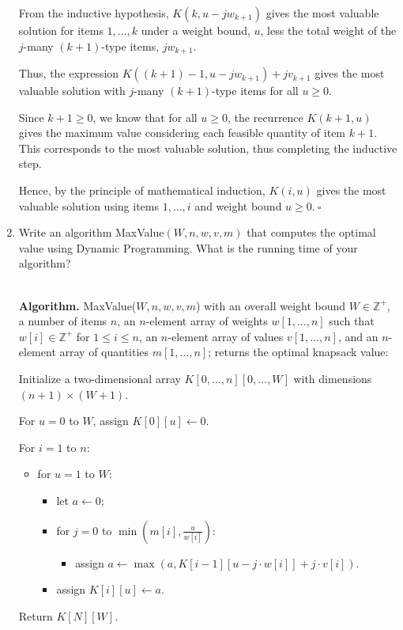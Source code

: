 \begin{enumerate}
\begin{solution}
From the inductive hypothesis, $K(k,u-jw_{k+1})$ gives the most valuable solution for items $1,\dots,k$ under a weight bound, $u$, less the total weight of the $j$-many $(k+1)$-type items, $jw_{k+1}$.

Thus, the expression $K((k+1)-1,u-jw_{k+1})+jv_{k+1}$ gives the most valuable solution with $j$-many $(k+1)$-type items for all $u\geq 0$.

Since $k+1\geq 0$, we know that for all $u\geq 0$, the recurrence $K(k+1,u)$ gives the maximum value considering each feasible quantity of item $k+1$. This corresponds to the most valuable solution, thus completing the inductive step.

Hence, by the principle of mathematical induction, $K(i,u)$ gives the most valuable solution using items $1,\dots,i$ and weight bound $u\geq 0$.$~\square$
\end{solution}
\newpage
\item Write an algorithm {\sc MaxValue}$(W,n,w,v,m)$ that computes the optimal value using Dynamic Programming. What is the running time of your algorithm?
\begin{solution}\\

\textbf{Algorithm. }{\sc MaxValue}($W,n,w,v,m$) with an overall weight bound $W\in\mathbb{Z}^+$, a number of items $n$, an $n$-element array of weights $w[1,\dots,n]$ such that $w[i]\in\mathbb{Z}^+$ for $1\leq i\leq n$, an $n$-element array of values $v[1,\dots,n]$, and an $n$-element array of quantities $m[1,\dots,n]$; returns the optimal knapsack value:

Initialize a two-dimensional array $K[0,\dots,n][0,\dots,W]$ with dimensions $(n+1)\times(W+1)$.

For $u=0$ to $W$, assign $K[0][u]\leftarrow 0$.

For $i=1$ to $n$:
\begin{itemize}
\item for $u=1$ to $W$:
\begin{itemize}
\item let $a\leftarrow 0$;
\item for $j=0$ to $\min\left(m[i],\frac{u}{w[i]}\right)$:
\begin{itemize}
\item assign $a\leftarrow\max(a,K[i-1][u-j\cdot w[i]]+j\cdot v[i])$.
\end{itemize}
\item assign $K[i][u]\leftarrow a$.
\end{itemize}
\end{itemize}
Return $K[N][W]$.\\


\end{solution}
\end{enumerate}

